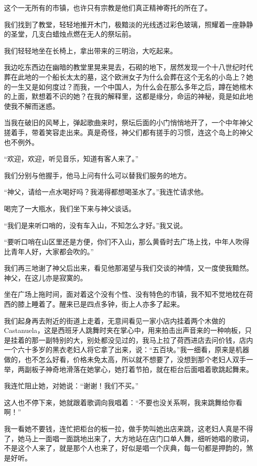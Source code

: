 \par 这个一无所有的市镇，也许只有宗教是他们真正精神寄托的所在了。
\par 我们找到了教堂，轻轻地推开木门，极黯淡的光线透过彩色玻璃，照耀着一座静静的圣堂，几支白蜡烛点燃在无人的祭坛前。
\par 我们轻轻地坐在长椅上，拿出带来的三明治，大吃起来。
\par 我边吃东西边在幽暗的教堂里晃来晃去，石砌的地下，居然发现一个十八世纪时代葬在此地的一个船长太太的墓，这个欧洲女子为什么会葬在这个无名的小岛上？她的一生又是如何度过？而我，一个中国人，为什么会在那么多年之后，蹲在她棺木的上面，默想着不识的她？在我的解释里，这都是缘分，命运的神秘，竟是如此地使我不解而迷惑。
\par 当我在破旧的风琴上，弹起歌曲来时，祭坛后面的小门悄悄地开了，一个中年神父搓着手，带着笑容走出来。真是奇怪，神父们都有搓手的习惯，连这个岛上的神父也不例外。
\par “欢迎，欢迎，听见音乐，知道有客人来了。”
\par 我们分别与他握手，他马上问有什么可以替我们服务的地方。
\par “神父，请给一点水喝好吗？我渴得都想喝圣水了。”我连忙请求他。
\par 喝完了一大瓶水，我们坐下来与神父谈话。
\par “我们是来听口哨的，没有车入山，不知怎么才好。”我又说。
\par “要听口哨在山区里还是方便，你们不入山，那么黄昏时去广场上找，中年人吹得比青年人好，大家都会吹的。”
\par 我们再三地谢了神父后出来，看见他那渴望与我们交谈的神情，又一度使我黯然。神父，在这儿亦是寂寞的。
\par 坐在广场上拖时间，面对着这个没有个性、没有特色的市镇，我不知不觉地枕在荷西的膝上睡着了。醒来已是四点多钟，街上人亦多了起来。
\par 我们起身再去附近的街道上走着，无意间看见一家小店内挂着两个木做的Castanuela，这是西班牙人跳舞时夹在掌心中，用来拍击出声音来的一种响板，只是挂着的那一副特别的大，别处都没见过的，我马上拉了荷西进店去问价钱，店内一个六十多岁的黑衣老妇人将它拿了出来，说：“五百块。”我一细看，原来是机器做的，也不怎么好看，价格未免太高，所以就不想要了，没想到那个老妇人双手一举，两副板子神奇地滑落在她掌心，她打着节拍，就在柜台后面唱着歌跳起舞来。
\par 我连忙阻止她，对她说：“谢谢！我们不买。”
\par 这人也不停下来，她就跟着歌调向我唱着：“不要也没关系啊，我来跳舞给你看啊！”
\par 我一看她不要钱，连忙把柜台的板一拉，做手势叫她出店来跳，这老妇人真是不得了，她马上一面唱一面跳地出来了，大方地站在店门口单人舞，细听她唱的歌词，不是这个人来了，就是那个人也来了，好似是唱一个庆典，每一句都是押韵的，煞是好听。
